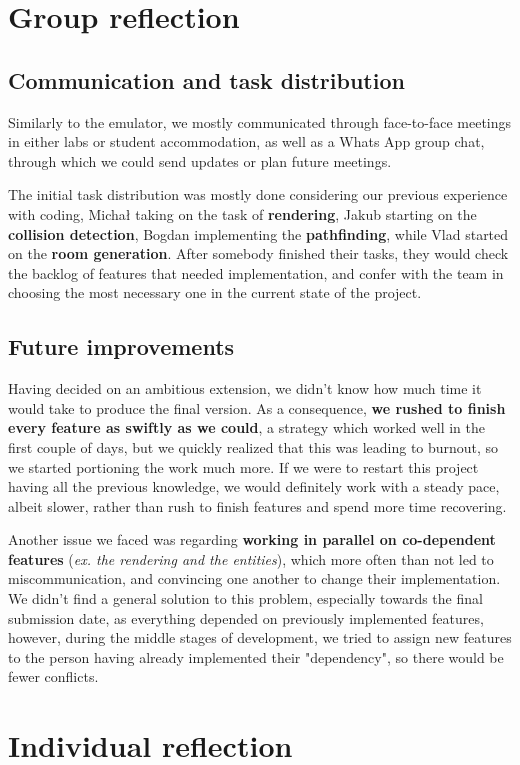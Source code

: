 \documentclass{article}
\begin{document}
\section{Group reflection}
\subsection{Communication and task distribution}
Similarly to the emulator, we mostly communicated through face-to-face meetings in either labs or student accommodation, as well as a Whats App group chat, through which we could send updates or plan future meetings.\par
The initial task distribution was mostly done considering our previous experience with coding, Michał taking on the task of \textbf{rendering}, Jakub starting on the \textbf{collision detection}, Bogdan implementing the \textbf{pathfinding}, while Vlad started on the \textbf{room generation}. After somebody finished their tasks, they would check the backlog of features that needed implementation, and confer with the team in choosing the most necessary one in the current state of the project.
\subsection{Future improvements}
Having decided on an ambitious extension, we didn't know how much time it would take to produce the final version. As a consequence, \textbf{we rushed to finish every feature as swiftly as we could}, a strategy which worked well in the first couple of days, but we quickly realized that this was leading to burnout, so we started portioning the work much more. If we were to restart this project having all the previous knowledge, we would definitely work with a steady pace, albeit slower, rather than rush to finish features and spend more time recovering. \par
Another issue we faced was regarding \textbf{working in parallel on co-dependent features} (\textit{ex. the rendering and the entities}), which more often than not led to miscommunication, and convincing one another to change their implementation. We didn't find a general solution to this problem, especially towards the final submission date, as everything depended on previously implemented features, however, during the middle stages of development, we tried to assign new features to the person having already implemented their "dependency", so there would be fewer conflicts.

\section{Individual reflection}
\end{document}

